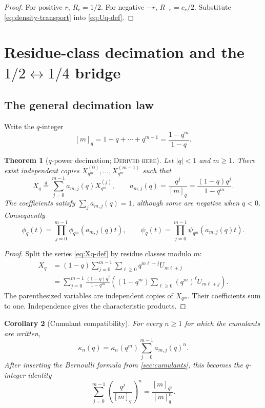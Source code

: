 \documentclass[11pt,oneside]{article}
\newtheorem{theorem}{Theorem}[section]
\newtheorem{corollary}[theorem]{Corollary}
\theoremstyle{definition}
\theoremstyle{remark}
\newcommand{\Derived}{\textsc{Derived here}}
\begin{document}
\begin{proof}
For positive \(r\), \(R_r=1/2\).  For negative \(-r\),
\(R_{-r}=c_r/2\).  Substitute \eqref{eq:density-transport} into
\eqref{eq:Uq-def}.
\end{proof}

\section{Residue-class decimation and the \texorpdfstring{\(1/2\leftrightarrow1/4\)}{1/2--1/4} bridge}

\subsection{The general decimation law}
Write the \(q\)-integer
\[
 [m]_q=1+q+\cdots+q^{m-1}=\frac{1-q^m}{1-q}.
\]

\begin{theorem}[\(q\)-power decimation; \Derived]\label{thm:decimation}
Let \(|q|<1\) and \(m\ge1\).  There exist independent copies
\(X_{q^m}^{(0)},\ldots,X_{q^m}^{(m-1)}\) such that
\begin{equation}\label{eq:decimation}
 X_q\stackrel d=\sum_{j=0}^{m-1}a_{m,j}(q)X_{q^m}^{(j)},
 \qquad
 a_{m,j}(q)=\frac{q^j}{[m]_q}
 =\frac{(1-q)q^j}{1-q^m}.
\end{equation}
The coefficients satisfy \(\sum_ja_{m,j}(q)=1\), although some are negative
when \(q<0\).  Consequently
\begin{equation}\label{eq:decimation-char}
 \phi_q(t)=\prod_{j=0}^{m-1}\phi_{q^m}(a_{m,j}(q)t),
 \qquad
 \psi_q(t)=\prod_{j=0}^{m-1}\psi_{q^m}(a_{m,j}(q)t).
\end{equation}
\end{theorem}

\begin{proof}
Split the series \eqref{eq:Xq-def} by residue classes modulo \(m\):
\begin{align*}
 X_q
 &=(1-q)\sum_{j=0}^{m-1}\sum_{\ell\ge0}q^{m\ell+j}U_{m\ell+j}\\
 &=\sum_{j=0}^{m-1}\frac{(1-q)q^j}{1-q^m}
 \left((1-q^m)\sum_{\ell\ge0}(q^m)^\ell U_{m\ell+j}\right).
\end{align*}
The parenthesized variables are independent copies of \(X_{q^m}\).  Their
coefficients sum to one.  Independence gives the characteristic products.
\end{proof}

\begin{corollary}[Cumulant compatibility]
For every \(n\ge1\) for which the cumulants are written,
\begin{equation}\label{eq:decimation-cumulants}
 \kappa_n(q)=\kappa_n(q^m)\sum_{j=0}^{m-1}a_{m,j}(q)^n.
\end{equation}
After inserting the Bernoulli formula from \cref{sec:cumulants}, this becomes
the \(q\)-integer identity
\begin{equation}\label{eq:qinteger-decimation}
 \sum_{j=0}^{m-1}\left(\frac{q^j}{[m]_q}\right)^n
 =\frac{[m]_{q^n}}{[m]_q^n}.
\end{equation}
\end{corollary}
\end{document}
